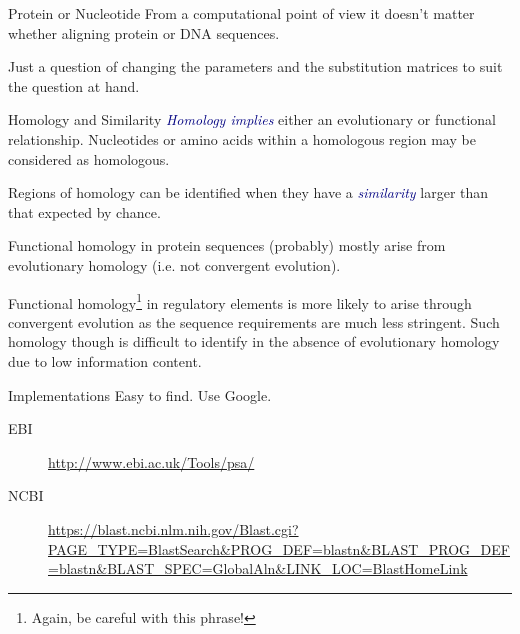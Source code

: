 \documentclass[pdf]{beamer}
\begin{document}
\begin{frame}{Protein or Nucleotide}
  From a computational point of view it doesn't matter whether aligning
  protein or DNA sequences. 

  Just a question of changing the parameters and the
  substitution matrices to suit the question at hand.

\end{frame}

\begin{frame}{Homology and Similarity}
  \textcolor{navy}{\emph{Homology implies}} either an evolutionary or functional
  relationship. Nucleotides or amino acids within a homologous
  region may be considered as homologous.

  Regions of homology can be identified when they have a \textcolor{navy}{\emph{similarity}}
  larger than that expected by chance.

  Functional homology in protein sequences (probably) mostly arise
  from evolutionary homology (i.e. not convergent evolution).

  Functional homology\footnote{Again, be careful with this phrase!} in regulatory elements is more likely to arise through
  convergent evolution as the sequence requirements are much less stringent.
  Such homology though is difficult to identify in the absence of evolutionary
  homology due to low information content.
  
\end{frame}

\begin{frame}{Implementations}
  Easy to find. Use Google.
  \begin{description}
  \item[EBI] \url{http://www.ebi.ac.uk/Tools/psa/}
  \item[NCBI]
    \url{https://blast.ncbi.nlm.nih.gov/Blast.cgi?PAGE_TYPE=BlastSearch\&PROG_DEF=blastn\&BLAST_PROG_DEF=blastn\&BLAST_SPEC=GlobalAln&LINK_LOC=BlastHomeLink}
  \end{description}
\end{frame}



\end{document}
